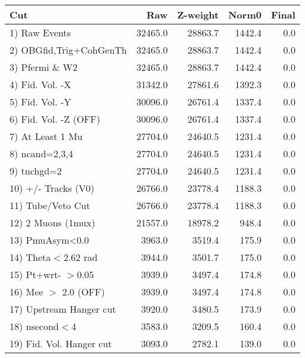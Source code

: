  \begin{table}[h!]\centering
 \begin{tabular}{||l||r|r|r|r||}
 \hline
 \hline
 Cut & Raw & Z-weight & Norm0 & Final \\
 \hline
  1) Raw Events           &     32465.0 &     28863.7 &      1442.4 &         0.0 \\
  2) OBGfid,Trig+CohGenTh &     32465.0 &     28863.7 &      1442.4 &         0.0 \\
  3) Pfermi \& W2         &     32465.0 &     28863.7 &      1442.4 &         0.0 \\
  4) Fid. Vol. -X         &     31342.0 &     27861.6 &      1392.3 &         0.0 \\
  5) Fid. Vol. -Y         &     30096.0 &     26761.4 &      1337.4 &         0.0 \\
  6) Fid. Vol. -Z (OFF)   &     30096.0 &     26761.4 &      1337.4 &         0.0 \\
  7) At Least 1 Mu        &     27704.0 &     24640.5 &      1231.4 &         0.0 \\
  8) ncand=2,3,4          &     27704.0 &     24640.5 &      1231.4 &         0.0 \\
  9) tnchgd=2             &     27704.0 &     24640.5 &      1231.4 &         0.0 \\
 10) +/- Tracks (V0)      &     26766.0 &     23778.4 &      1188.3 &         0.0 \\
 11) Tube/Veto Cut        &     26766.0 &     23778.4 &      1188.3 &         0.0 \\
 12) 2 Muons (1mux)       &     21557.0 &     18978.2 &       948.4 &         0.0 \\
 13) PmuAsym<0.0          &      3963.0 &      3519.4 &       175.9 &         0.0 \\
 14) Theta$<$2.62 rad     &      3944.0 &      3501.7 &       175.0 &         0.0 \\
 15) Pt+wrt- $>$0.05      &      3939.0 &      3497.4 &       174.8 &         0.0 \\
 16) Mee $>$ 2.0  (OFF)   &      3939.0 &      3497.4 &       174.8 &         0.0 \\
 17) Upstream Hanger cut  &      3920.0 &      3480.5 &       173.9 &         0.0 \\
 18) nsecond$<$4          &      3583.0 &      3209.5 &       160.4 &         0.0 \\
 19) Fid. Vol. Hanger cut &      3093.0 &      2782.1 &       139.0 &         0.0 \\

\end{tabular}
\end{table}

